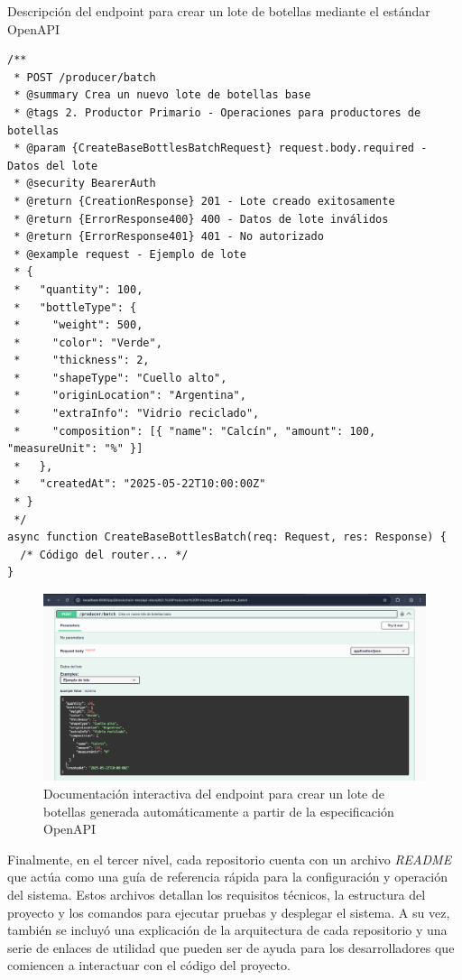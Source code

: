 \begin{listing}[!htb]
\caption{Descripción del endpoint para crear un lote de botellas mediante el estándar OpenAPI}
\label{listing:openapi-create-batch-code}
\begin{verbatim}
/** 
 * POST /producer/batch
 * @summary Crea un nuevo lote de botellas base
 * @tags 2. Productor Primario - Operaciones para productores de botellas
 * @param {CreateBaseBottlesBatchRequest} request.body.required - Datos del lote
 * @security BearerAuth
 * @return {CreationResponse} 201 - Lote creado exitosamente
 * @return {ErrorResponse400} 400 - Datos de lote inválidos
 * @return {ErrorResponse401} 401 - No autorizado
 * @example request - Ejemplo de lote
 * {
 *   "quantity": 100,
 *   "bottleType": {
 *     "weight": 500,
 *     "color": "Verde",
 *     "thickness": 2,
 *     "shapeType": "Cuello alto",
 *     "originLocation": "Argentina",
 *     "extraInfo": "Vidrio reciclado",
 *     "composition": [{ "name": "Calcín", "amount": 100, "measureUnit": "%" }]
 *   },
 *   "createdAt": "2025-05-22T10:00:00Z"
 * } 
 */
async function CreateBaseBottlesBatch(req: Request, res: Response) { 
  /* Código del router... */ 
}
\end{verbatim}
\end{listing}

\begin{figure}[!htb]
	\centering
	\includegraphics[width=\textwidth]{Figures/openapi-endpoint.png}
	\caption{Documentación interactiva del \gls{endpoint} para crear un lote de botellas generada automáticamente a partir de la especificación OpenAPI}
	\label{fig:openapi-docs}
\end{figure}

Finalmente, en el tercer nivel, cada repositorio cuenta con un archivo \textit{README} que actúa como una guía de referencia rápida para la configuración y operación del sistema. Estos archivos detallan los requisitos técnicos, la estructura del proyecto y los comandos para ejecutar pruebas y desplegar el sistema. A su vez, también se incluyó una explicación de la arquitectura de cada repositorio y una serie de enlaces de utilidad que pueden ser de ayuda para los desarrolladores que comiencen a interactuar con el código del proyecto.

